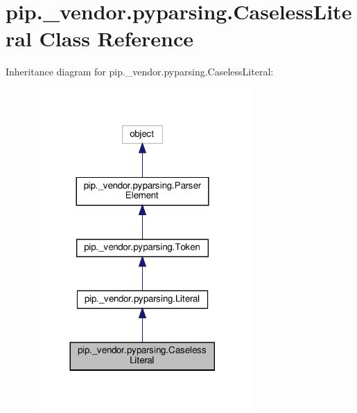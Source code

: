 \hypertarget{classpip_1_1__vendor_1_1pyparsing_1_1CaselessLiteral}{}\section{pip.\+\_\+vendor.\+pyparsing.\+Caseless\+Literal Class Reference}
\label{classpip_1_1__vendor_1_1pyparsing_1_1CaselessLiteral}


Inheritance diagram for pip.\+\_\+vendor.\+pyparsing.\+Caseless\+Literal\+:
\nopagebreak
\begin{figure}[H]
\begin{center}
\leavevmode
\includegraphics[width=236pt]{classpip_1_1__vendor_1_1pyparsing_1_1CaselessLiteral__inherit__graph}
\end{center}
\end{figure}


